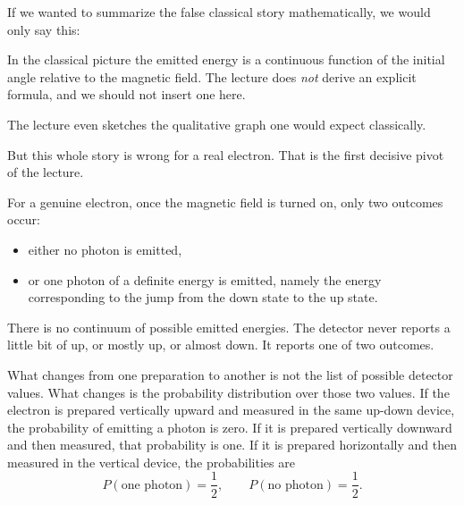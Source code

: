 If we wanted to summarize the false classical story mathematically, we would only say this:

\begin{remark}
In the classical picture the emitted energy is a continuous function of the initial angle relative to the magnetic field. The lecture does \emph{not} derive an explicit formula, and we should not insert one here.
\end{remark}

The lecture even sketches the qualitative graph one would expect classically.

\begin{figure}[h]
\centering
{}
\end{figure}

But this whole story is wrong for a real electron. That is the first decisive pivot of the lecture.

For a genuine electron, once the magnetic field is turned on, only two outcomes occur:
\begin{itemize}
\item either no photon is emitted,
\item or one photon of a definite energy is emitted, namely the energy corresponding to the jump from the down state to the up state.
\end{itemize}

There is no continuum of possible emitted energies. The detector never reports a little bit of up, or mostly up, or almost down. It reports one of two outcomes.

What changes from one preparation to another is not the list of possible detector values. What changes is the probability distribution over those two values. If the electron is prepared vertically upward and measured in the same up-down device, the probability of emitting a photon is zero. If it is prepared vertically downward and then measured, that probability is one. If it is prepared horizontally and then measured in the vertical device, the probabilities are
\begin{equation}
P(\text{one photon})=\frac{1}{2},
\qquad
P(\text{no photon})=\frac{1}{2}.
\end{equation}

